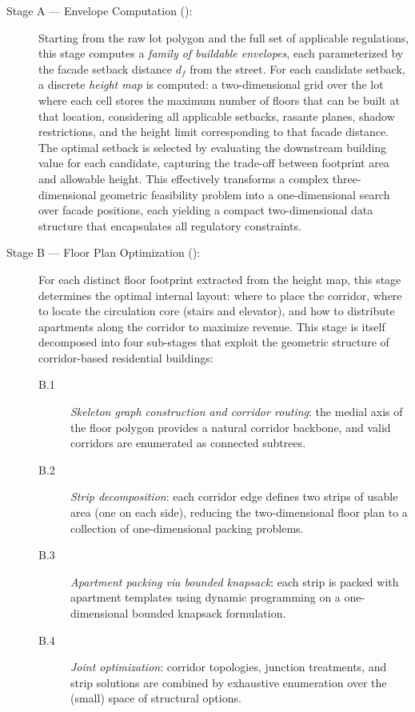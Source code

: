 \documentclass[11pt,a4paper]{article}
\begin{document}
\begin{description}
    \item[Stage A --- Envelope Computation ():]
    Starting from the raw lot polygon and the full set of applicable
    regulations, this stage computes a \emph{family of buildable
    envelopes}, each parameterized by the facade setback distance
    $d_f$ from the street. For each candidate setback, a discrete
    \emph{height map} is computed: a two-dimensional grid over the lot
    where each cell stores the maximum number of floors that can be
    built at that location, considering all applicable setbacks,
    rasante planes, shadow restrictions, and the height limit
    corresponding to that facade distance. The optimal setback is
    selected by evaluating the downstream building value for each
    candidate, capturing the trade-off between footprint area and
    allowable height. This effectively transforms a complex
    three-dimensional geometric feasibility problem into a
    one-dimensional search over facade positions, each yielding a
    compact two-dimensional data structure that encapsulates all
    regulatory constraints.

    \item[Stage B --- Floor Plan Optimization ():]
    For each distinct floor footprint extracted from the height map,
    this stage determines the optimal internal layout: where to place
    the corridor, where to locate the circulation core (stairs and
    elevator), and how to distribute apartments along the corridor to
    maximize revenue. This stage is itself decomposed into four
    sub-stages that exploit the geometric structure of
    corridor-based residential buildings:
    \begin{description}
        \item[B.1] \emph{Skeleton graph construction and corridor routing}:
        the medial axis of the floor polygon provides a natural corridor
        backbone, and valid corridors are enumerated as connected subtrees.
        \item[B.2] \emph{Strip decomposition}: each corridor edge defines
        two strips of usable area (one on each side), reducing the
        two-dimensional floor plan to a collection of one-dimensional
        packing problems.
        \item[B.3] \emph{Apartment packing via bounded knapsack}: each
        strip is packed with apartment templates using dynamic
        programming on a one-dimensional bounded knapsack formulation.
        \item[B.4] \emph{Joint optimization}: corridor topologies,
        junction treatments, and strip solutions are combined by
        exhaustive enumeration over the (small) space of structural
        options.
    \end{description}


\end{description}
\end{document}
